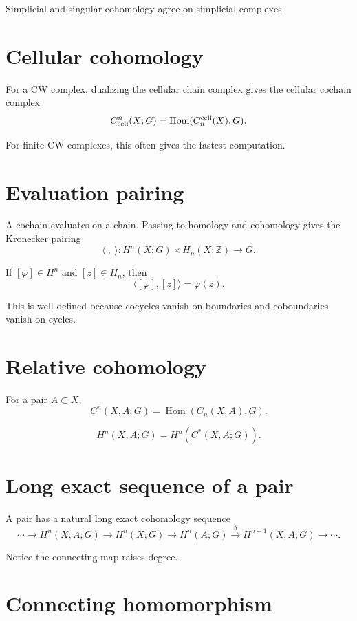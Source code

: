 Simplicial and singular cohomology agree on simplicial complexes.

\section{Cellular cohomology}

For a CW complex, dualizing the cellular chain complex gives the cellular
cochain complex
\[
C^n_{\rm cell}(X;G)
=
\operatorname{Hom}(C_n^{\rm cell}(X),G).
\]

For finite CW complexes, this often gives the fastest computation.

\section{Evaluation pairing}

A cochain evaluates on a chain.  Passing to homology and cohomology gives the
Kronecker pairing
\[
\langle\ ,\ \rangle:
H^n(X;G)\times H_n(X;\mathbb Z)\to G.
\]

If \([\varphi]\in H^n\) and \([z]\in H_n\), then
\[
\langle[\varphi],[z]\rangle=\varphi(z).
\]

This is well defined because cocycles vanish on boundaries and coboundaries
vanish on cycles.

\section{Relative cohomology}

For a pair \(A\subset X\),
\[
C^n(X,A;G)
=
\operatorname{Hom}(C_n(X,A),G).
\]

\begin{definition}
\label{def:viii28-relative}
\[
H^n(X,A;G)=H^n(C^*(X,A;G)).
\]
\end{definition}

\section{Long exact sequence of a pair}

A pair has a natural long exact cohomology sequence
\[
\cdots
\to H^n(X,A;G)
\to H^n(X;G)
\to H^n(A;G)
\xrightarrow{\delta}
H^{n+1}(X,A;G)
\to\cdots.
\]

Notice the connecting map raises degree.

\section{Connecting homomorphism}


